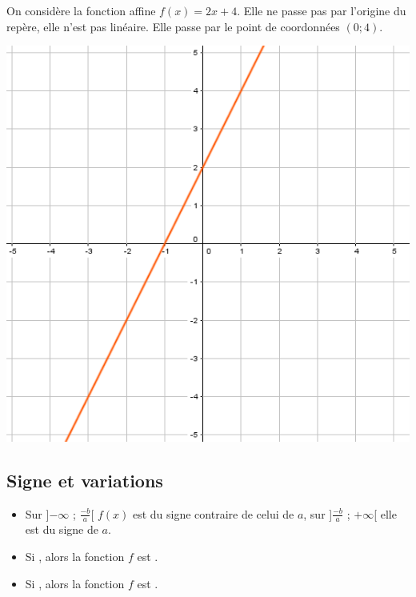 \documentclass[12pt,a4paper]{article}
\begin{document}
	\begin{myex}
		\begin{multicols}{2}
			\vspace*{1.5cm}
			On considère la fonction affine $f(x)=2x+4$. Elle ne passe pas par l'origine du repère, elle n'est pas linéaire. Elle passe par le point de coordonnées $(0;4)$.
			
			\includegraphics[scale=0.5]{img/ex1}
		\end{multicols}
	\end{myex}

	\subsection{Signe et variations}
	
	\begin{myprops}
		\begin{itemize}
			\item Sur ]$- \infty$ ; $\frac{- b}{a}$[ $f(x)$ est du signe contraire de celui de $a$, sur ]$\frac{- b}{a}$ ; $+ \infty$[ elle est du signe de $a$.
			\item Si , alors la fonction $f$ est .
			\item Si , alors la fonction $f$ est .
		\end{itemize}
	\end{myprops}
\end{document}
